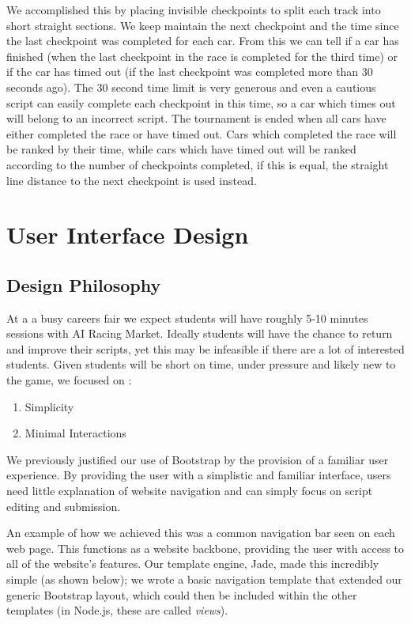 We accomplished this by placing invisible checkpoints to split each track into short straight sections. We keep maintain the next checkpoint and the time since the last checkpoint was completed for each car. From this we can tell if a car has finished (when the last checkpoint in the race is completed for the third time) or if the car has timed out (if the last checkpoint was completed more than 30 seconds ago). The 30 second time limit is very generous and even a cautious script can easily complete each checkpoint in this time, so a car which times out will belong to an incorrect script. The tournament is ended when all cars have either completed the race or have timed out. Cars which completed the race will be ranked by their time, while cars which have timed out will be ranked according to the number of checkpoints completed, if this is equal, the straight line distance to the next checkpoint is used instead.

\section{User Interface Design}

\subsection{Design Philosophy}

At a a busy careers fair we expect students will have roughly 5-10 minutes sessions with AI Racing Market. Ideally students will have the chance to return and improve their scripts, yet this may be infeasible if there are a lot of interested students. Given students will be short on time, under pressure and likely new to the game, we focused on :
\vspace{-1mm}
\begin{enumerate} \itemsep -2pt 
\item Simplicity
\item Minimal Interactions
\end{enumerate}

We previously justified our use of Bootstrap by the provision of a familiar user experience. By providing the user with a simplistic and familiar interface, users need little explanation of website navigation and can simply focus on script editing and submission. 

An example of how we achieved this was a common navigation bar seen on each web page. This functions as a website backbone, providing the user with access to all of the website's  features. Our template engine, Jade, made this incredibly simple (as shown below); we wrote a basic navigation template that extended our generic Bootstrap layout, which could then be included within the other templates (in Node.js, these are called {\it views}). 

